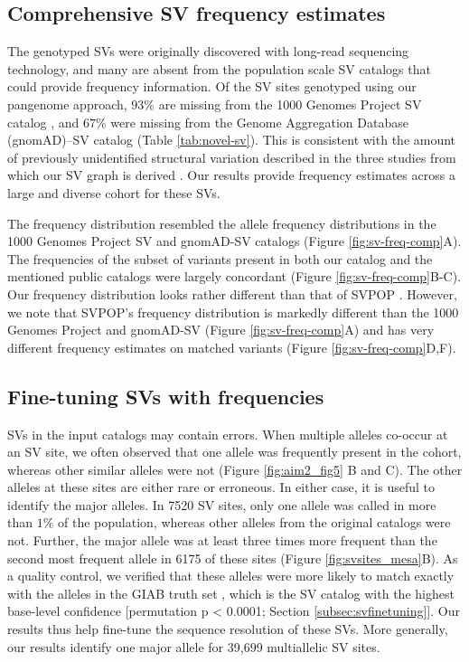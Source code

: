 \documentclass[11pt]{ucscthesis}
\begin{document}
\subsection{Comprehensive SV frequency estimates}
The genotyped SVs were originally discovered with long-read sequencing technology, and many are absent from the population scale SV catalogs that could provide frequency information.
Of the SV sites genotyped using our pangenome approach, $93\%$ are missing from the 1000 Genomes Project SV catalog \cite{1000gp_sv_2015}, and $67\%$ were missing from the Genome Aggregation Database (gnomAD)–SV catalog \cite{gnomadsv_2020} (Table \ref{tab:novel-sv}).
This is consistent with the amount of previously unidentified structural variation described in the three studies from which our SV graph is derived \cite{zook_robust_2020, chaisson_sv_2019,audano2019c}.
Our results provide frequency estimates across a large and diverse cohort for these SVs.

The frequency distribution resembled the allele frequency distributions in the 1000 Genomes Project SV and gnomAD-SV catalogs (Figure \ref{fig:sv-freq-comp}A).
The frequencies of the subset of variants present in both our catalog and the mentioned public catalogs were largely concordant (Figure \ref{fig:sv-freq-comp}B-C).
Our frequency distribution looks rather different than that of SVPOP \cite{audano2019c}.
However, we note that SVPOP’s frequency distribution is markedly different than the 1000 Genomes Project and gnomAD-SV (Figure \ref{fig:sv-freq-comp}A) and has very different frequency estimates on matched variants (Figure \ref{fig:sv-freq-comp}D,F).

\subsection{Fine-tuning SVs with frequencies}
SVs in the input catalogs may contain errors.
When multiple alleles co-occur at an SV site, we often observed that one allele was frequently present in the cohort, whereas other similar alleles were not (Figure \ref{fig:aim2_fig5} B and C).
The other alleles at these sites are either rare or erroneous.
In either case, it is useful to identify the major alleles.
In 7520 SV sites, only one allele was called in more than $1\%$ of the population, whereas other alleles from the original catalogs were not.
Further, the major allele was at least three times more frequent than the second most frequent allele in 6175 of these sites (Figure \ref{fig:svsites_mesa}B).
As a quality control, we verified that these alleles were more likely to match exactly with the alleles in the GIAB truth set \cite{zook_robust_2020}, which is the SV catalog with the highest base-level confidence [permutation p < 0.0001; Section \ref{subsec:svfinetuning}].
Our results thus help fine-tune the sequence resolution of these SVs.
More generally, our results identify one major allele for 39,699 multiallelic SV sites.
\end{document}
